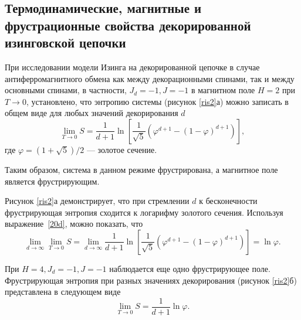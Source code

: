 \subsection{Термодинамические, магнитные и фрустрационные свойства декорированной изинговской цепочки}

При исследовании модели Изинга на декорированной цепочке в случае антиферромагнитного обмена как между декорационными спинами, так и между основными спинами, в частности, \mbox{$J_d=-1, J=-1$} в магнитном поле $H=2$ при $T\rightarrow 0$, установлено, что энтропию системы (рисунок \ref{ris2}а) можно записать в общем виде для любых значений декорирования $d$
\begin{equation}
\lim_{T \rightarrow 0} S = \frac{1}{d+1} \ln \left[\frac{1}{\sqrt{5}}\left(\varphi^{d+1}-(1-\varphi)^{d+1}\right)\right],
\label{20d}
\end{equation}
где $\varphi=(1+\sqrt{5})/2$ --- золотое сечение.

Таким образом, система в данном режиме фрустрирована, а магнитное поле является фрустрирующим.

Рисунок \ref{ris2}а демонстрирует, что при стремлении $d$ к бесконечности фрустрирующая энтропия сходится к логарифму золотого сечения. Используя выражение~\eqref{20d}, можно показать, что
\begin{equation}
\lim_{d\rightarrow \infty} \lim_{T \rightarrow 0} S = \lim_{d\rightarrow \infty} \frac{1}{d+1} \ln \left[\frac{1}{\sqrt{5}}\left(\varphi^{d+1}-(1-\varphi)^{d+1}\right)\right] = \ln \varphi.
\label{21d}
\end{equation}

При \mbox{$H=4, J_d=-1, J=-1$} наблюдается еще одно фрустрирующее поле. Фрустрирующая энтропия при разных значениях декорирования (рисунок \ref{ris2}б) представлена в следующем виде
\begin{equation}
\lim_{T \rightarrow 0} S = \frac{1}{d+1} \ln \varphi.
\label{22d}
\end{equation}


